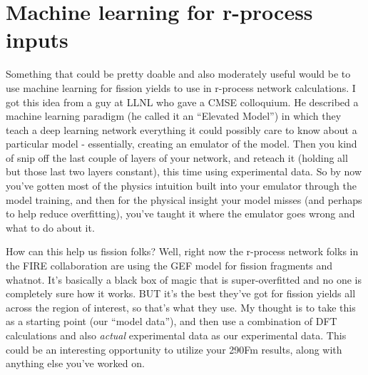 \section{Machine learning for r-process inputs}
Something that could be pretty doable and also moderately useful would be to use machine learning for fission yields to use in r-process network calculations. I got this idea from a guy at LLNL who gave a CMSE colloquium. He described a machine learning paradigm (he called it an ``Elevated Model'') in which they teach a deep learning network everything it could possibly care to know about a particular model - essentially, creating an emulator of the model. Then you kind of snip off the last couple of layers of your network, and reteach it (holding all but those last two layers constant), this time using experimental data. So by now you've gotten most of the physics intuition built into your emulator through the model training, and then for the physical insight your model misses (and perhaps to help reduce overfitting), you've taught it where the emulator goes wrong and what to do about it.

How can this help us fission folks? Well, right now the r-process network folks in the FIRE collaboration are using the GEF model for fission fragments and whatnot. It's basically a black box of magic that is super-overfitted and no one is completely sure how it works. BUT it's the best they've got for fission yields all across the region of interest, so that's what they use. My thought is to take this as a starting point (our ``model data''), and then use a combination of DFT calculations and also \textit{actual} experimental data as our experimental data. This could be an interesting opportunity to utilize your 290Fm results, along with anything else you've worked on.

